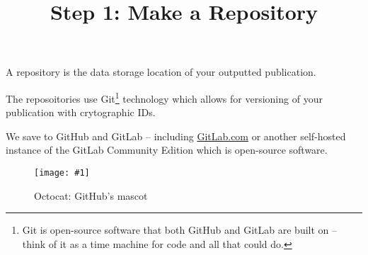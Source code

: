 \documentclass{article}
\newlength{\imgwidth}
\newcommand\scaledgraphics[2]{%
                
\settowidth{\imgwidth}{\texttt{[image: \#1]}}%
                
\setlength{\imgwidth}{\minof{\imgwidth}{#2\textwidth}}%
                
\texttt{[image: \#1]}%
                
}
\begin{document}
\title{Step 1: Make a Repository}

\maketitle


A repository is the data storage location of your outputted publication.


The reposoitories use Git\footnote{Git is open-source software that both GitHub and GitLab are built on – think of it as a time machine for code and all that could do.} technology which allows for versioning of your publication with crytographic IDs.


We save to GitHub and GitLab\autocite{PerkelJeffrey2016} – including \href{GitLab.com}{GitLab.com} or another self-hosted instance of the GitLab Community Edition which is open-source software.

\begin{figure}
\scaledgraphics{5656f6ad-7ef0-4a57-9d81-9fc2ecfc77bc.png}{0.5}
\caption*{Octocat: GitHub's mascot}\label{F44428261}
\end{figure}





\printbibliography[title={Bibliography}]
\end{document}
